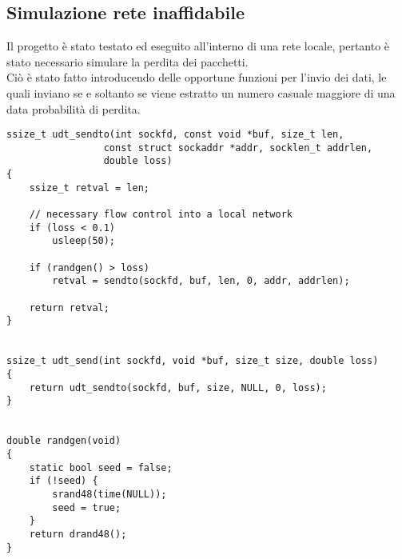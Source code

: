 \subsection{Simulazione rete inaffidabile}
Il progetto è stato testato ed eseguito all'interno di una rete locale, pertanto è stato necessario simulare la perdita dei pacchetti.\\
Ciò è stato fatto introducendo delle opportune funzioni per l'invio dei dati, le quali inviano se e soltanto se viene estratto un numero casuale maggiore di una data probabilità di perdita.

\begin{lstlisting}[title=simul\_udt.c]
ssize_t udt_sendto(int sockfd, const void *buf, size_t len, 
				 const struct sockaddr *addr, socklen_t addrlen,
				 double loss)
{
	ssize_t retval = len;

	// necessary flow control into a local network
	if (loss < 0.1)
		usleep(50);

	if (randgen() > loss) 
		retval = sendto(sockfd, buf, len, 0, addr, addrlen);

	return retval;
}


ssize_t udt_send(int sockfd, void *buf, size_t size, double loss)
{
	return udt_sendto(sockfd, buf, size, NULL, 0, loss);
}


double randgen(void)
{
	static bool seed = false;
	if (!seed) {
		srand48(time(NULL));
		seed = true;
	}
	return drand48();
}
\end{lstlisting}
